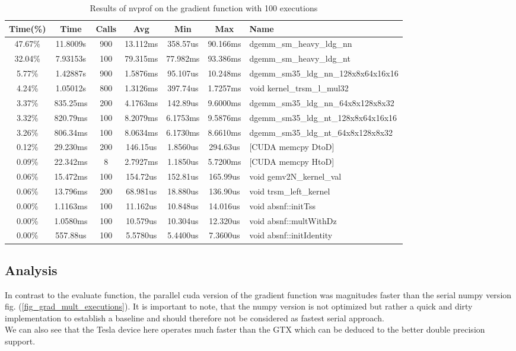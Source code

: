 \begin{table}
	\centering
	\begin{tabular}{c|c|c|c|c|c|l}
		Time(\%) &     Time  &   Calls  &      Avg  &      Min  &      Max  & Name \\
		\hline
		47.67\% &  11.8009s &      900 &  13.112ms &  358.57us &  90.166ms &  dgemm\_sm\_heavy\_ldg\_nn \\
		32.04\% &  7.93153s &      100 &  79.315ms &  77.982ms &  93.386ms &  dgemm\_sm\_heavy\_ldg\_nt \\
		5.77\% &  1.42887s &      900 &  1.5876ms &  95.107us &  10.248ms &  dgemm\_sm35\_ldg\_nn\_128x8x64x16x16 \\
		4.24\% &  1.05012s &      800 &  1.3126ms &  397.74us &  1.7257ms &  void kernel\_trsm\_l\_mul32 \\
		3.37\% &  835.25ms &      200 &  4.1763ms &  142.89us &  9.6000ms &  dgemm\_sm35\_ldg\_nn\_64x8x128x8x32 \\
		3.32\% &  820.79ms &      100 &  8.2079ms &  6.1753ms &  9.5876ms &  dgemm\_sm35\_ldg\_nt\_128x8x64x16x16 \\
		3.26\% &  806.34ms &      100 &  8.0634ms &  6.1730ms &  8.6610ms &  dgemm\_sm35\_ldg\_nt\_64x8x128x8x32 \\
		0.12\% &  29.230ms &      200 &  146.15us &  1.8560us &  294.63us &  [CUDA memcpy DtoD] \\
		0.09\% &  22.342ms &        8 &  2.7927ms &  1.1850us &  5.7200ms &  [CUDA memcpy HtoD] \\
		0.06\% &  15.472ms &      100 &  154.72us &  152.81us &  165.99us &  void gemv2N\_kernel\_val \\
		0.06\% &  13.796ms &      200 &  68.981us &  18.880us &  136.90us &  void trsm\_left\_kernel \\
		0.00\% &  1.1163ms &      100 &  11.162us &  10.848us &  14.016us &  void absnf::initTss \\
		0.00\% &  1.0580ms &      100 &  10.579us &  10.304us &  12.320us &  void absnf::multWithDz \\
		0.00\% &  557.88us &      100 &  5.5780us &  5.4400us &  7.3600us &  void absnf::initIdentity \\
	\end{tabular}
	\caption{Results of nvprof on the gradient function with 100 executions \label{tab_gradient_nvprof}}
\end{table}

\subsection{Analysis}
In contrast to the evaluate function, the parallel cuda version of the gradient function was magnitudes faster than the serial numpy version fig. (\ref{fig_grad_mult_executions}). It is important to note, that the numpy version is not optimized but rather a quick and dirty implementation to establish a baseline and should therefore not be considered as fastest serial approach.  \\
We can also see that the Tesla device here operates much faster than the GTX which can be deduced to the better double precision support. \\


